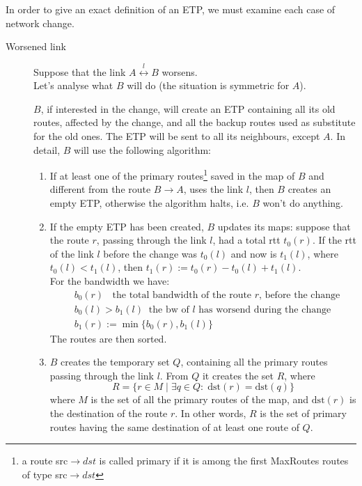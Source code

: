 \documentclass[a4paper]{article}
\newcommand{\T}[1]{\textrm{#1}}
\begin{document}
In order to give an exact definition of an ETP, we must examine each case of network change.
\begin{description}
	\item[Worsened link] 
		\label{wlink}
		Suppose that the link $A
		\stackrel{l}{\leftrightarrow} B$ worsens.\\
		Let's analyse what $B$ will do (the situation is symmetric for
		$A$).

		$B$, if interested in the change, will create an ETP
		containing all its old routes, affected by the change, and all
		the backup routes used as substitute for the old ones. The ETP
		will be sent to all its neighbours, except $A$. In detail,
		$B$ will use the following algorithm:
		\begin{enumerate}
		\item If at least one of the primary
		       routes\footnote{
				a route src$\rightarrow dst$ is called primary
				if it is among the first MaxRoutes routes of
				type src$\rightarrow dst$}
			saved in the map
			of $B$ and different from the route $B\rightarrow A$, uses the link $l$, then $B$ creates an
			empty ETP, otherwise the algorithm halts, i.e. $B$
			won't do anything.
		\item \label{upmap}
			If the empty ETP has been created, $B$ updates its maps:
			suppose that the route $r$, passing through the link
			$l$, had a total rtt $t_0(r)$. If the rtt of the link
			$l$ before the change was $t_0(l)$ and now is
			$t_1(l)$, where $t_0(l) < t_1(l)$, then
			$t_1(r):=t_0(r)-t_0(l)+t_1(l)$.\\
			For the bandwidth we have:
			\begin{align*}
				&b_0(r)\;\;\T{ the total bandwidth of the
				route $r$, before the change}\\
				&b_0(l) > b_1(l)\;\;\T{the bw of $l$ has
				worsend during the change}\\
				&b_1(r):=\min \{b_0(r), b_1(l)\}
			\end{align*}
			The routes are then sorted.
		\item \label{stepR} 
			$B$ creates the temporary set $Q$, 
			containing all the primary
			routes passing through the link $l$. From $Q$
			it creates the set $R$, where
			\[
			R=\{r\in M\;|\;\exists q\in Q:\;\T{dst}(r)=\T{dst}(q)\}
			\]
			where $M$ is the set of all the primary routes of the map, and 
			$\T{dst}(r)$ is the destination of the route $r$. In
			other words, $R$ is the set of primary routes having
			the same destination of at least one route of $Q$.

\end{enumerate}
\end{description}
\end{document}
